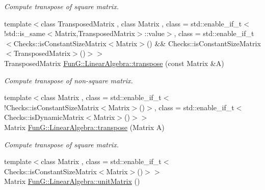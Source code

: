\begin{DoxyCompactItemize}
\begin{DoxyCompactList}\small\item\em Compute transpose of square matrix. \end{DoxyCompactList}\item 
\hypertarget{group__LinearAlgebraGroup_gad41d49388690a00ea6706fced526ac5a}{{\footnotesize template$<$class Transposed\-Matrix , class Matrix , class  = std\-::enable\-\_\-if\-\_\-t$<$!std\-::is\-\_\-same$<$\-Matrix,\-Transposed\-Matrix$>$\-::value$>$, class  = std\-::enable\-\_\-if\-\_\-t$<$\-Checks\-::is\-Constant\-Size\-Matrix$<$\-Matrix$>$() \&\& Checks\-::is\-Constant\-Size\-Matrix$<$\-Transposed\-Matrix$>$()$>$$>$ }\\Transposed\-Matrix \hyperlink{group__LinearAlgebraGroup_gad41d49388690a00ea6706fced526ac5a}{Fun\-G\-::\-Linear\-Algebra\-::transpose} (const Matrix \&A)}\label{group__LinearAlgebraGroup_gad41d49388690a00ea6706fced526ac5a}

\begin{DoxyCompactList}\small\item\em Compute transpose of non-\/square matrix. \end{DoxyCompactList}\item 
\hypertarget{group__LinearAlgebraGroup_gabceb8c3e29678d5b52c9dd8f90c8ddac}{{\footnotesize template$<$class Matrix , class  = std\-::enable\-\_\-if\-\_\-t$<$!\-Checks\-::is\-Constant\-Size\-Matrix$<$\-Matrix$>$()$>$, class  = std\-::enable\-\_\-if\-\_\-t$<$\-Checks\-::is\-Dynamic\-Matrix$<$\-Matrix$>$()$>$$>$ }\\Matrix \hyperlink{group__LinearAlgebraGroup_gabceb8c3e29678d5b52c9dd8f90c8ddac}{Fun\-G\-::\-Linear\-Algebra\-::transpose} (Matrix A)}\label{group__LinearAlgebraGroup_gabceb8c3e29678d5b52c9dd8f90c8ddac}

\begin{DoxyCompactList}\small\item\em Compute transpose of square matrix. \end{DoxyCompactList}\item 
\hypertarget{group__LinearAlgebraGroup_ga88a596b8526c0ed98ce241244fb85948}{{\footnotesize template$<$class Matrix , class  = std\-::enable\-\_\-if\-\_\-t$<$\-Checks\-::is\-Constant\-Size\-Matrix$<$\-Matrix$>$()$>$$>$ }\\Matrix \hyperlink{group__LinearAlgebraGroup_ga88a596b8526c0ed98ce241244fb85948}{Fun\-G\-::\-Linear\-Algebra\-::unit\-Matrix} ()}\label{group__LinearAlgebraGroup_ga88a596b8526c0ed98ce241244fb85948}


\end{DoxyCompactItemize}
